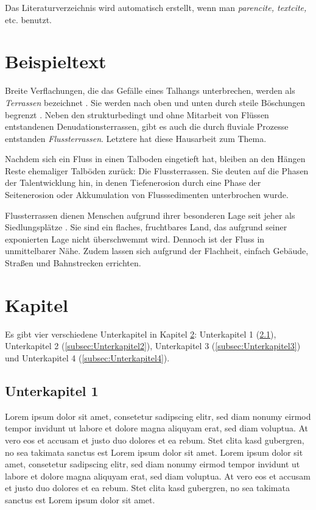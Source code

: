 			Das Literaturverzeichnis wird automatisch erstellt, wenn man \emph{parencite, textcite,} etc. benutzt.
		
	\section{Beispieltext}
		Breite Verflachungen, die das Gefälle eines Talhangs unterbrechen, werden als \emph{Terrassen} bezeichnet \parencite[97]{Wilhelmy.2002}. Sie werden nach oben und unten durch steile Böschungen begrenzt \parencite[211]{Ahnert.2015}. Neben den strukturbedingt und ohne Mitarbeit von Flüssen entstandenen Denudationsterrassen, gibt es auch die durch fluviale Prozesse entstanden \emph{Flussterrassen}. Letztere hat diese Hausarbeit zum Thema.
		
		Nachdem sich ein Fluss in einen Talboden eingetieft hat, bleiben an den Hängen Reste ehemaliger Talböden zurück: Die Flussterrassen. Sie deuten auf die Phasen der Talentwicklung hin, in denen Tiefenerosion durch eine Phase der Seitenerosion oder Akkumulation von Flusssedimenten unterbrochen wurde.
		
		Flussterrassen dienen Menschen aufgrund ihrer besonderen Lage seit jeher als Siedlungsplätze \parencite[575]{Strahler.2009}. Sie sind ein flaches, fruchtbares Land, das aufgrund seiner exponierten Lage nicht überschwemmt wird. Dennoch ist der Fluss in unmittelbarer Nähe. Zudem lassen sich aufgrund der Flachheit, einfach Gebäude, Straßen und Bahnstrecken errichten.

	\section{Kapitel}
		\label{sec:Kapitel}
	
		Es gibt vier verschiedene Unterkapitel in Kapitel \ref{sec:Kapitel}: Unterkapitel 1 (\ref{subsec:Unterkapitel1}), Unterkapitel 2 (\ref{subsec:Unterkapitel2}), Unterkapitel 3 (\ref{subsec:Unterkapitel3}) und Unterkapitel 4 (\ref{subsec:Unterkapitel4}).
		
		\subsection{Unterkapitel 1}
			\label{subsec:Unterkapitel1}
		
			Lorem ipsum dolor sit amet, consetetur sadipscing elitr, sed diam nonumy eirmod tempor invidunt ut labore et dolore magna aliquyam erat, sed diam voluptua. At vero eos et accusam et justo duo dolores et ea rebum. Stet clita kasd gubergren, no sea takimata sanctus est Lorem ipsum dolor sit amet. Lorem ipsum dolor sit amet, consetetur sadipscing elitr, sed diam nonumy eirmod tempor invidunt ut labore et dolore magna aliquyam erat, sed diam voluptua. At vero eos et accusam et justo duo dolores et ea rebum. Stet clita kasd gubergren, no sea takimata sanctus est Lorem ipsum dolor sit amet.
					
